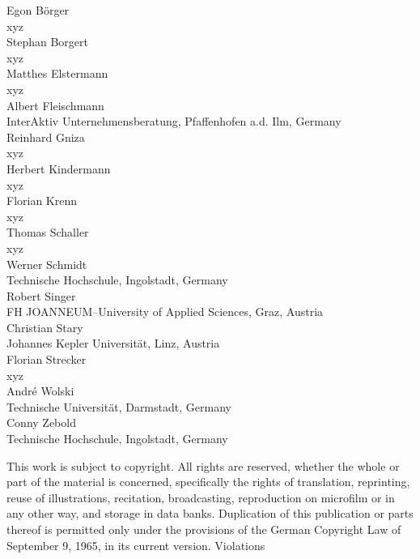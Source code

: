 \documentclass[11pt, showtrims, final, oldfontcommands]{memoir}
\begin{document}
\begingroup
\footnotesize
\setlength{\parindent}{0pt}
\setlength{\parskip}{\baselineskip}
\vspace*{3cm}
\begin{flushleft}
	Egon B\"orger\\
	xyz\\
	\medskip
	Stephan Borgert\\
	xyz\\
	\medskip
	Matthes Elstermann\\
	xyz\\
	\medskip
	Albert Fleischmann\\
	InterAktiv Unternehmensberatung, Pfaffenhofen a.d. Ilm, Germany\\
	\medskip
	Reinhard Gniza\\
	xyz\\
	\medskip
	Herbert Kindermann\\
	xyz\\
	\medskip
	Florian Krenn\\
	xyz\\
	\medskip
	Thomas Schaller\\
	xyz\\
	\medskip
	Werner Schmidt\\
	Technische Hochschule, Ingolstadt, Germany\\
	\medskip
	Robert Singer\\
	FH JOANNEUM--University of Applied Sciences, Graz, Austria\\
	\medskip
	Christian Stary\\
	Johannes Kepler Universit\"at, Linz, Austria\\
	\medskip
	Florian Strecker\\
	xyz\\
	\medskip
	Andr\'e Wolski\\
	Technische Universit\"at, Darmstadt, Germany\\
	\medskip
	Conny Zebold\\
	Technische Hochschule, Ingolstadt, Germany\\
\end{flushleft}
\vspace*{\fill}
This work is subject to copyright. All rights are reserved, whether the whole or part of the material is concerned, specifically the rights of translation, reprinting, reuse of illustrations, recitation, broadcasting, reproduction on microfilm or in any other way, and storage in data banks. Duplication of this publication or parts thereof is permitted only under the provisions of the German Copyright Law of September 9, 1965, in its current version. Violations
\end{document}
